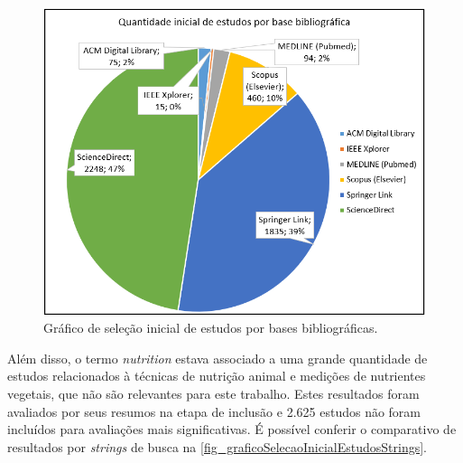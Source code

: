 \begin{figure}[htb]
	\caption{\label{fig_graficoSelecaoInicialEstudos}Gráfico de seleção inicial de estudos por bases bibliográficas.}
	\begin{center}
	    \includegraphics[scale=0.467]{Imagens/grafico - selecao inicial de estudos por base.png}
	\end{center}
\end{figure}

Além disso, o termo \textit{nutrition} estava associado a uma grande quantidade de estudos relacionados à técnicas de nutrição animal e medições de nutrientes vegetais, que não são relevantes para este trabalho. Estes resultados foram avaliados por seus resumos na etapa de inclusão e 2.625 estudos não foram incluídos para avaliações mais significativas. É possível conferir o comparativo de resultados por \textit{strings} de busca na \autoref{fig_graficoSelecaoInicialEstudosStrings}.

